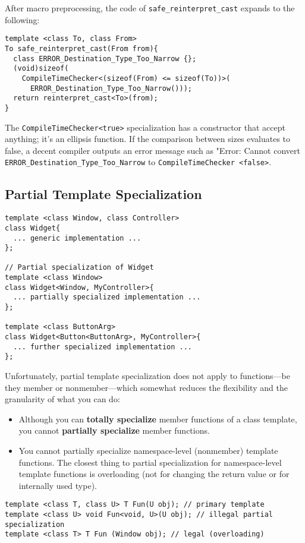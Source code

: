 After macro preprocessing, the code of \texttt{safe\_reinterpret\_cast}
expands to the following:

\begin{verbatim}
template <class To, class From>
To safe_reinterpret_cast(From from){
  class ERROR_Destination_Type_Too_Narrow {};
  (void)sizeof(
    CompileTimeChecker<(sizeof(From) <= sizeof(To))>(
      ERROR_Destination_Type_Too_Narrow()));
  return reinterpret_cast<To>(from);
}
\end{verbatim}

The \texttt{CompileTimeChecker<true>} specialization has a constructor
that accept anything; it's an ellipsis function. If the comparison
between sizes evaluates to false, a decent compiler outputs an error
message such as "Error: Cannot convert
\texttt{ERROR\_Destination\_Type\_Too\_Narrow} to
\texttt{CompileTimeChecker <false>}.

\subsection{Partial Template Specialization}

\begin{verbatim}
template <class Window, class Controller>
class Widget{
  ... generic implementation ...
};

// Partial specialization of Widget
template <class Window>
class Widget<Window, MyController>{
  ... partially specialized implementation ...
};

template <class ButtonArg>
class Widget<Button<ButtonArg>, MyController>{
  ... further specialized implementation ...
};
\end{verbatim}

Unfortunately, partial template specialization does not apply to
functions—be they member or nonmember—which somewhat reduces the
flexibility and the granularity of what you can do:
\begin{itemize}
\item Although you can \textbf{totally specialize} member functions of
  a class template, you cannot \textbf{partially specialize} member
  functions.
\item You cannot partially specialize namespace-level (nonmember)
  template functions. The closest thing to partial specialization for
  namespace-level template functions is overloading (not for changing the
  return value or for internally used type).
\end{itemize}

\begin{verbatim}
template <class T, class U> T Fun(U obj); // primary template
template <class U> void Fun<void, U>(U obj); // illegal partial specialization
template <class T> T Fun (Window obj); // legal (overloading)
\end{verbatim}
